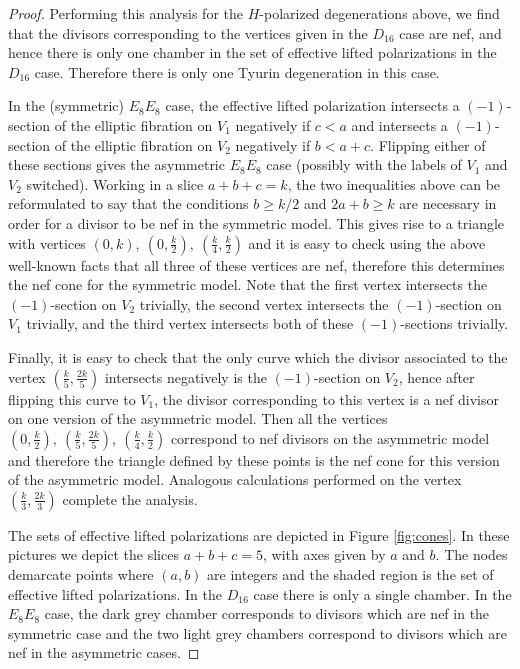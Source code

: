 \documentclass[a4paper]{amsart}
\theoremstyle{definition}
\theoremstyle{plain}
\theoremstyle{remark}
\numberwithin{figure}{section}
\numberwithin{table}{section}
\begin{document}
\begin{proof}
Performing this analysis for the $H$-polarized degenerations above, we find that the divisors corresponding to the vertices given in the $D_{16}$ case are nef, and hence there is only one chamber in the set of effective lifted polarizations in the $D_{16}$ case. Therefore there is only one Tyurin degeneration in this case.

In the (symmetric) $E_8E_8$ case, the effective lifted polarization intersects a $(-1)$-section of the elliptic fibration on $V_1$ negatively if  $c < a $  and intersects a $(-1)$-section of the elliptic fibration on $V_2$ negatively if $b < a + c$. Flipping either of these sections gives the asymmetric $E_8E_8$ case (possibly with the labels of $V_1$ and $V_2$ switched). Working in a slice $a+b+c=k$, the two inequalities above can be reformulated to say that the conditions $b\geq k/2$ and $2a+b\geq k$ are necessary in order for a divisor to be nef in the symmetric model. This gives rise to a triangle with vertices $(0,k),~\left(0,\frac{k}{2}\right),~ \left(\frac{k}{4},\frac{k}{2}\right)$ and it is easy to check using the above well-known facts that all three of these vertices are nef, therefore this determines the nef cone for the symmetric model. Note that the first vertex intersects the $(-1)$-section on $V_2$ trivially, the second vertex intersects the $(-1)$-section on $V_1$ trivially, and the third vertex intersects both of these $(-1)$-sections trivially. 

Finally, it is easy to check that the only curve which the divisor associated to the vertex $\left(\frac{k}{5},\frac{2k}{5}\right)$ intersects negatively is the $(-1)$-section on $V_2$, hence after flipping this curve to $V_1$, the divisor corresponding to this vertex is a nef divisor on one version of the asymmetric model. Then all the vertices $\left(0,\frac{k}{2}\right),~\left(\frac{k}{5},\frac{2k}{5}\right),~ \left(\frac{k}{4},\frac{k}{2}\right)$ correspond to nef divisors on the asymmetric model and therefore the triangle defined by these points is the nef cone for this version of the asymmetric model. Analogous calculations performed on the vertex $\left(\frac{k}{3},\frac{2k}{3}\right)$ complete the analysis. 

The sets of effective lifted polarizations are depicted in Figure \ref{fig:cones}. In these pictures we depict the slices $a+b+c = 5$, with axes given by $a$ and $b$. The nodes demarcate points where $(a,b)$ are integers and the shaded region is the set of effective lifted polarizations. In the $D_{16}$ case there is only a single chamber. In the $E_8E_8$ case, the dark grey chamber corresponds to divisors which are nef in the symmetric case and the two light grey chambers correspond to divisors which are nef in the asymmetric cases.


\end{proof}
\end{document}

